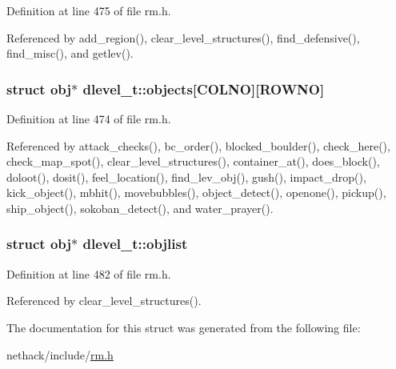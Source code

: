 Definition at line 475 of file rm.\+h.



Referenced by add\+\_\+region(), clear\+\_\+level\+\_\+structures(), find\+\_\+defensive(), find\+\_\+misc(), and getlev().

\hypertarget{structdlevel__t_ac128f805d01d7746b499596dd3b92a53}{
\subsubsection[{objects}]{\setlength{\rightskip}{0pt plus 5cm}struct {\bf obj}$\ast$ dlevel\+\_\+t\+::objects\mbox{[}{\bf C\+O\+L\+N\+O}\mbox{]}\mbox{[}{\bf R\+O\+W\+N\+O}\mbox{]}}}\label{structdlevel__t_ac128f805d01d7746b499596dd3b92a53}


Definition at line 474 of file rm.\+h.



Referenced by attack\+\_\+checks(), bc\+\_\+order(), blocked\+\_\+boulder(), check\+\_\+here(), check\+\_\+map\+\_\+spot(), clear\+\_\+level\+\_\+structures(), container\+\_\+at(), does\+\_\+block(), doloot(), dosit(), feel\+\_\+location(), find\+\_\+lev\+\_\+obj(), gush(), impact\+\_\+drop(), kick\+\_\+object(), mbhit(), movebubbles(), object\+\_\+detect(), openone(), pickup(), ship\+\_\+object(), sokoban\+\_\+detect(), and water\+\_\+prayer().

\hypertarget{structdlevel__t_afee783efef1938e1008410cd3e182f2f}{
\subsubsection[{objlist}]{\setlength{\rightskip}{0pt plus 5cm}struct {\bf obj}$\ast$ dlevel\+\_\+t\+::objlist}}\label{structdlevel__t_afee783efef1938e1008410cd3e182f2f}


Definition at line 482 of file rm.\+h.



Referenced by clear\+\_\+level\+\_\+structures().



The documentation for this struct was generated from the following file\+:\begin{DoxyCompactItemize}
\item 
nethack/include/\hyperlink{rm_8h}{rm.\+h}\end{DoxyCompactItemize}

